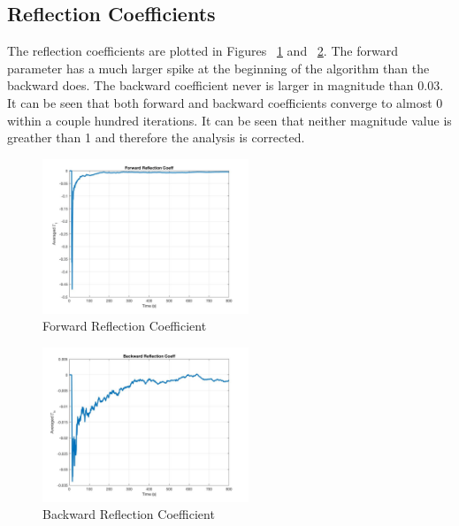 \documentclass[journal]{IEEEtran}
\begin{document}
\subsection{Reflection Coefficients}
The reflection coefficients are plotted in Figures ~\ref{fig:gammaf} and ~\ref{fig:gammab}. The
forward parameter has a much larger spike at the beginning of the algorithm than the backward does. The backward
coefficient never is larger in magnitude than 0.03. It can be seen that both forward and backward coefficients converge to
almost 0 within a couple hundred iterations. It can be seen that neither magnitude value is greather than 1 and therefore
the analysis is corrected.
\begin{figure}[H]
  \centering
  \captionsetup{justification=centering,font = small}
  \includegraphics[width=0.55\textwidth, inner] {Plots/Project3_GAMMA_F.jpg}
  \caption{Forward Reflection Coefficient}
    \label{fig:gammaf}
\end{figure}
\begin{figure}[H]
  \centering
  \captionsetup{justification=centering,font = small}
  \includegraphics[width=0.55\textwidth, inner] {Plots/Project3_GAMMA_B.jpg}
  \caption{Backward Reflection Coefficient}
    \label{fig:gammab}
\end{figure}
\end{document}
